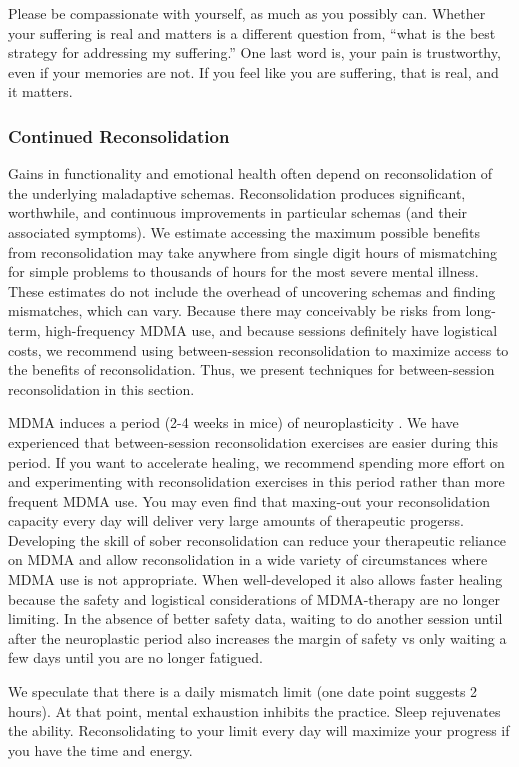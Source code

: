 \documentclass[12pt,letterpaper]{article}
\begin{document}
Please be compassionate with yourself, as much as you possibly can. Whether your suffering is real and matters is a different question from, “what is the best strategy for addressing my suffering.” One last word is, your pain is trustworthy, even if your memories are not. If you feel like you are suffering, that is real, and it matters.
\subsubsection{Continued Reconsolidation}
\label{sec:moreReconsolidation}
Gains in functionality and emotional health often depend on reconsolidation of the underlying maladaptive schemas. Reconsolidation produces significant, worthwhile, and continuous improvements in particular schemas (and their associated symptoms). We estimate accessing the maximum possible benefits from reconsolidation may take anywhere from single digit hours of mismatching for simple problems to thousands of hours for the most severe mental illness. These estimates do not include the overhead of uncovering schemas and finding mismatches, which can vary. Because there may conceivably be risks from long-term, high-frequency MDMA use, and because sessions definitely have logistical costs, we recommend using between-session reconsolidation to maximize access to the benefits of reconsolidation. Thus, we present techniques for between-session reconsolidation in this section.

MDMA induces a period (2-4 weeks in mice) of neuroplasticity \cite{nardouMDMAPlasticity}. We have experienced that between-session reconsolidation exercises are easier during this period. If you want to accelerate healing, we recommend spending more effort on and experimenting with reconsolidation exercises in this period rather than more frequent MDMA use. You may even find that maxing-out your reconsolidation capacity every day will deliver very large amounts of therapeutic progerss. Developing the skill of sober reconsolidation can reduce your therapeutic reliance on MDMA and allow reconsolidation in a wide variety of circumstances where MDMA use is not appropriate. When well-developed it also allows faster healing because the safety and logistical considerations of MDMA-therapy are no longer limiting. In the absence of better safety data, waiting to do another session until after the neuroplastic period also increases the margin of safety vs only waiting a few days until you are no longer fatigued.

We speculate that there is a daily mismatch limit (one date point suggests 2 hours). At that point, mental exhaustion inhibits the practice. Sleep rejuvenates the ability. Reconsolidating to your limit every day will maximize your progress if you have the time and energy.
\end{document}
